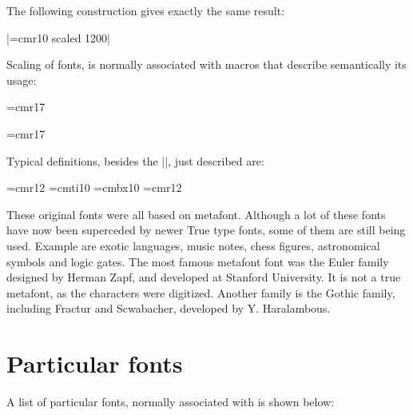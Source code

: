 \begin{multicols}{2}
The following construction gives exactly the same result:

|\font\twelverm=cmr10 scaled 1200|

Scaling of fonts, is normally associated with macros that describe semantically its usage:

\topline

\begin{teXX}
\font\titlefont=cmr17
\def \title #1{ {\titlefont \centerline {#1}}}
\end{teXX}

{\font\titlefont=cmr17
\def \title #1{ {\titlefont \centerline {#1}}}

{\centering {}\par}
}
\bottomline
\medskip

Typical definitions, besides the |\titlefont|, just described are:

\begin{teXX}
\font\authorfont=cmr12  
\font\addressfont=cmti10
\font\sectionfont=cmbx10
\font\figfont=cmr12
\end{teXX}


These original fonts were all based on metafont. Although a lot of these fonts have now been superceded by newer True type fonts, some of them are still being used. Example are exotic languages, music notes, chess figures, astronomical symbols and logic gates. The most famous metafont font was the Euler family designed by
Herman Zapf, and developed at Stanford University. It is not a true metafont, as the characters were digitized. Another family is the Gothic family, including Fractur and Scwabacher, developed by Y. Haralambous.


\section*{Particular fonts}

A list of particular fonts, normally associated with \tex is shown below:
\medskip
\end{multicols}

